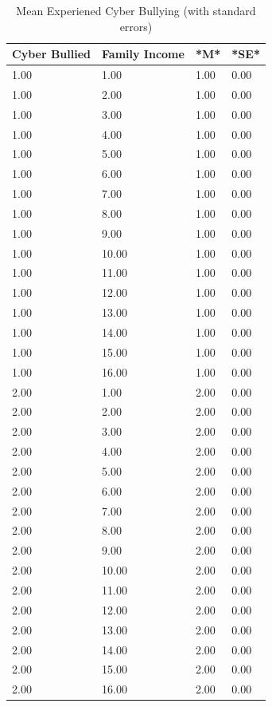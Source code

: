 \documentclass[
  man,LLO-8200, Introduction to Data Science]{apa6}
\begin{document}
\begin{table}[tbp]

\begin{center}
\begin{threeparttable}

\caption{\label{tab:unnamed-chunk-3}Mean Experiened Cyber Bullying (with standard errors)}

\begin{tabular}{llll}
\toprule
Cyber Bullied & \multicolumn{1}{c}{Family Income} & \multicolumn{1}{c}{*M*} & \multicolumn{1}{c}{*SE*}\\
\midrule
1.00 & 1.00 & 1.00 & 0.00\\
1.00 & 2.00 & 1.00 & 0.00\\
1.00 & 3.00 & 1.00 & 0.00\\
1.00 & 4.00 & 1.00 & 0.00\\
1.00 & 5.00 & 1.00 & 0.00\\
1.00 & 6.00 & 1.00 & 0.00\\
1.00 & 7.00 & 1.00 & 0.00\\
1.00 & 8.00 & 1.00 & 0.00\\
1.00 & 9.00 & 1.00 & 0.00\\
1.00 & 10.00 & 1.00 & 0.00\\
1.00 & 11.00 & 1.00 & 0.00\\
1.00 & 12.00 & 1.00 & 0.00\\
1.00 & 13.00 & 1.00 & 0.00\\
1.00 & 14.00 & 1.00 & 0.00\\
1.00 & 15.00 & 1.00 & 0.00\\
1.00 & 16.00 & 1.00 & 0.00\\
2.00 & 1.00 & 2.00 & 0.00\\
2.00 & 2.00 & 2.00 & 0.00\\
2.00 & 3.00 & 2.00 & 0.00\\
2.00 & 4.00 & 2.00 & 0.00\\
2.00 & 5.00 & 2.00 & 0.00\\
2.00 & 6.00 & 2.00 & 0.00\\
2.00 & 7.00 & 2.00 & 0.00\\
2.00 & 8.00 & 2.00 & 0.00\\
2.00 & 9.00 & 2.00 & 0.00\\
2.00 & 10.00 & 2.00 & 0.00\\
2.00 & 11.00 & 2.00 & 0.00\\
2.00 & 12.00 & 2.00 & 0.00\\
2.00 & 13.00 & 2.00 & 0.00\\
2.00 & 14.00 & 2.00 & 0.00\\
2.00 & 15.00 & 2.00 & 0.00\\
2.00 & 16.00 & 2.00 & 0.00\\
\bottomrule
\end{tabular}

\end{threeparttable}
\end{center}

\end{table}
\end{document}

